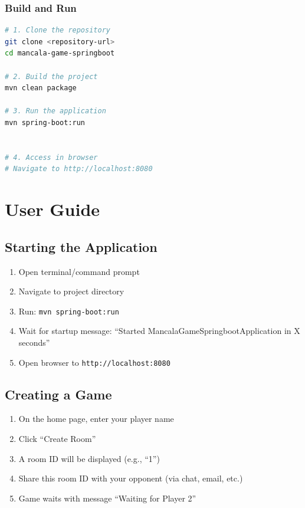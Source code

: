 \documentclass{scrartcl}
\begin{document}
\subsubsection{Build and Run}

\begin{lstlisting}[language=bash]
# 1. Clone the repository
git clone <repository-url>
cd mancala-game-springboot

# 2. Build the project
mvn clean package

# 3. Run the application
mvn spring-boot:run


# 4. Access in browser
# Navigate to http://localhost:8080
\end{lstlisting}



\section{User Guide}\label{user-guide}

\subsection{Starting the Application}

\begin{enumerate}
  \item Open terminal/command prompt
  \item Navigate to project directory
  \item Run: \texttt{mvn spring-boot:run}
  \item Wait for startup message: ``Started MancalaGameSpringbootApplication in X seconds''
  \item Open browser to \texttt{http://localhost:8080}
\end{enumerate}

\subsection{Creating a Game}

\begin{enumerate}
  \item On the home page, enter your player name
  \item Click ``Create Room''
  \item A room ID will be displayed (e.g., ``1'')
  \item Share this room ID with your opponent (via chat, email, etc.)
  \item Game waits with message ``Waiting for Player 2''
\end{enumerate}
\end{document}
